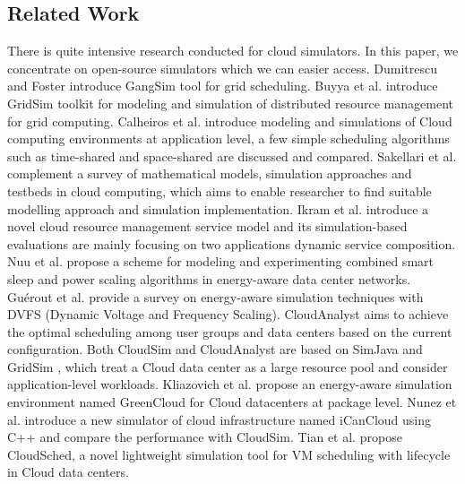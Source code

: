 \documentclass[3p, twocolumn]{elsarticle}
\begin{document}
\subsection {Related Work}
There is quite intensive research conducted for cloud simulators. In this paper, we concentrate on open-source simulators which we can easier access. Dumitrescu and Foster \cite{IEEEhowto:Dumitrescu} introduce GangSim tool for grid scheduling. Buyya et al. introduce GridSim \cite{IEEEhowto:Buyya0} toolkit for modeling and simulation of distributed resource management for grid computing.
Calheiros et al. \cite{IEEEhowto:Buyya} introduce modeling and simulations of Cloud computing environments at application level, a few simple scheduling algorithms such as time-shared and space-shared are discussed and compared.
Sakellari et al. \cite{IEEEhowto:Sakellari} complement a survey of mathematical models, simulation approaches and testbeds in cloud computing, which aims to enable researcher to find suitable modelling approach and simulation implementation.
Ikram et al. \cite{IEEEhowto:Ikram} introduce a novel cloud resource management service model and its simulation-based evaluations are mainly focusing on two applications dynamic service composition.
Nuu et al. \cite{IEEEhowto:Huu} propose a scheme for modeling and experimenting combined smart sleep and power scaling algorithms in energy-aware data center networks.
Guérout et al. \cite{IEEEhowto:Guerout} provide a survey on energy-aware simulation techniques with DVFS (Dynamic Voltage and Frequency Scaling). CloudAnalyst \cite{IEEEhowto:Wickremasinghe} aims to achieve the optimal scheduling among user groups and data centers based on the current configuration.
Both CloudSim and CloudAnalyst are based on SimJava \cite{IEEEhowto:Howell} and GridSim \cite{IEEEhowto:Buyya0}, which treat a Cloud data center as a large resource pool and consider application-level workloads. Kliazovich et al. \cite{Kliazovich2010} propose an energy-aware simulation environment named GreenCloud for Cloud datacenters at package level. Nunez et al. \cite{IEEEhowto:Nunez} introduce a new simulator of cloud infrastructure named iCanCloud using C++ and compare the performance with CloudSim. Tian et al. \cite{IEEEhowto:Tian2013-2} propose CloudSched, a novel lightweight simulation tool for VM scheduling with lifecycle in Cloud data centers.
\end{document}
